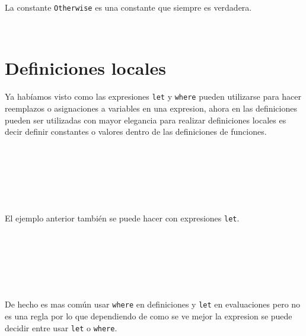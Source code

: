       La constante \texttt{Otherwise} es una constante que siempre es verdadera.
      
      \begin{fxcode}
         \\
      \end{fxcode}
      
   \section{Definiciones locales}
      Ya habíamos visto como las expresiones \texttt{let} y \texttt{where} pueden utilizarse para hacer reemplazos o asignaciones a variables en una expresion, ahora en las definiciones pueden ser utilizadas con mayor elegancia para realizar definiciones locales es decir definir constantes o valores dentro de las definiciones de funciones.
      
      \begin{fxcode}
         \\
         \\
         \\
         \\
         \\
      \end{fxcode}
      
      El ejemplo anterior también se puede hacer con expresiones \texttt{let}.
      
      \begin{fxcode}
         \\
         \\
         \\
         \\
         \\
      \end{fxcode}
      
      De hecho es mas común usar \texttt{where} en definiciones y \texttt{let} en evaluaciones pero no es una regla por lo que dependiendo de como se ve mejor la expresion se puede decidir entre usar \texttt{let} o \texttt{where}.
      
      \begin{fxcode}
         \\
         \\
         \\
         \\
      \end{fxcode}
      

